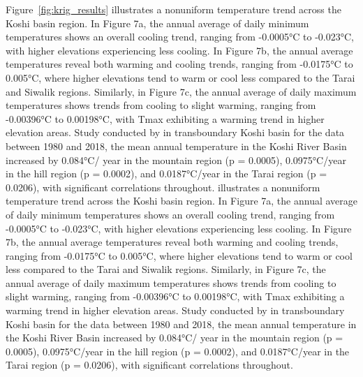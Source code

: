 Figure~\ref{fig:krig_results} illustrates a nonuniform temperature trend across the Koshi basin region. In Figure 7a, the annual average of daily minimum temperatures shows an overall cooling trend, ranging from -0.0005°C to -0.023°C, with higher elevations experiencing less cooling. In Figure 7b, the annual average temperatures reveal both warming and cooling trends, ranging from -0.0175°C to 0.005°C, where higher elevations tend to warm or cool less compared to the Tarai and Siwalik regions. Similarly, in Figure 7c, the annual average of daily maximum temperatures shows trends from cooling to slight warming, ranging from -0.00396°C to 0.00198°C, with Tmax exhibiting a warming trend in higher elevation areas. Study conducted by \parencite{paudel_climate_2021} in transboundary Koshi basin for the data between 1980 and 2018, the mean annual temperature in the Koshi River Basin increased by 0.084°C/ year in the mountain region (p = 0.0005), 0.0975°C/year in the hill region (p = 0.0002), and 0.0187°C/year in the Tarai region (p = 0.0206), with significant correlations throughout.  illustrates a nonuniform temperature trend across the Koshi basin region. In Figure 7a, the annual average of daily minimum temperatures shows an overall cooling trend, ranging from -0.0005°C to -0.023°C, with higher elevations experiencing less cooling. In Figure 7b, the annual average temperatures reveal both warming and cooling trends, ranging from -0.0175°C to 0.005°C, where higher elevations tend to warm or cool less compared to the Tarai and Siwalik regions. Similarly, in Figure 7c, the annual average of daily maximum temperatures shows trends from cooling to slight warming, ranging from -0.00396°C to 0.00198°C, with Tmax exhibiting a warming trend in higher elevation areas. Study conducted by \textcite{paudel_climate_2021} in transboundary Koshi basin for the data between 1980 and 2018, the mean annual temperature in the Koshi River Basin increased by 0.084°C/ year in the mountain region (p = 0.0005), 0.0975°C/year in the hill region (p = 0.0002), and 0.0187°C/year in the Tarai region (p = 0.0206), with significant correlations throughout. 

